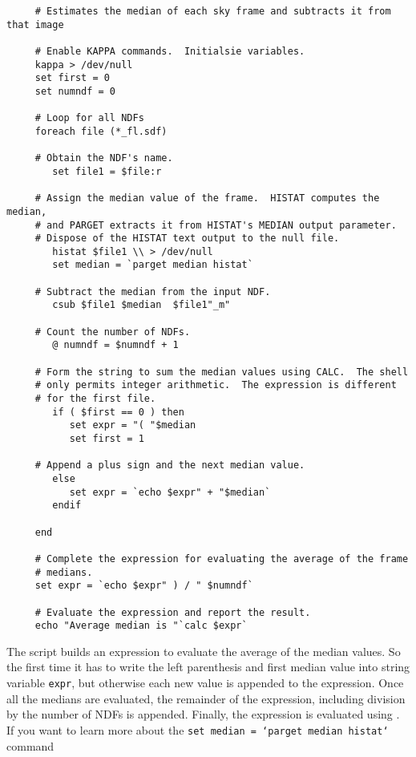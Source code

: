 \small
\begin{verbatim}
     # Estimates the median of each sky frame and subtracts it from that image

     # Enable KAPPA commands.  Initialsie variables.
     kappa > /dev/null
     set first = 0
     set numndf = 0

     # Loop for all NDFs
     foreach file (*_fl.sdf)

     # Obtain the NDF's name.
        set file1 = $file:r

     # Assign the median value of the frame.  HISTAT computes the median,
     # and PARGET extracts it from HISTAT's MEDIAN output parameter.
     # Dispose of the HISTAT text output to the null file.
        histat $file1 \\ > /dev/null
        set median = `parget median histat`

     # Subtract the median from the input NDF.
        csub $file1 $median  $file1"_m" 

     # Count the number of NDFs.
        @ numndf = $numndf + 1

     # Form the string to sum the median values using CALC.  The shell
     # only permits integer arithmetic.  The expression is different
     # for the first file. 
        if ( $first == 0 ) then
           set expr = "( "$median
           set first = 1

     # Append a plus sign and the next median value.
        else
           set expr = `echo $expr" + "$median`
        endif

     end

     # Complete the expression for evaluating the average of the frame
     # medians.
     set expr = `echo $expr" ) / " $numndf`

     # Evaluate the expression and report the result.
     echo "Average median is "`calc $expr`
\end{verbatim}
\normalsize
The script builds an expression to evaluate the average of the median
values.  So the first time it has to write the left parenthesis and
first median value into string variable {\tt expr}, but otherwise each
new value is appended to the expression.  Once all the medians are
evaluated, the remainder of the expression, including division by the
number of NDFs is appended.  Finally, the expression is evaluated using
.  If you want to learn more about the
\mbox{\tt set median = `parget median histat`} command

